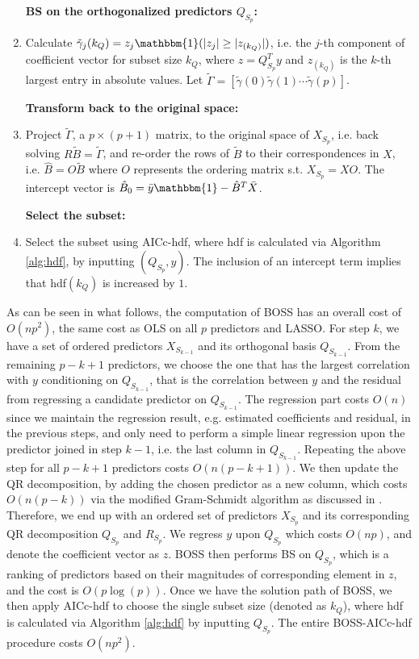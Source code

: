 \begin{algorithm}
\begin{enumerate}[label=\arabic*.]
		\textbf{BS on the orthogonalized predictors $Q_{S_{p}}$:}

		\item Calculate $\tilde{\gamma}_j (k_Q)= z_j \mathbbm{1}(|z_j| \ge |z_{(k_Q)}|)$, i.e. the $j$-th component of coefficient vector for subset size $k_Q$, where $z=Q_{S_p}^T y$ and $z_{(k_Q)}$ is the $k$-th largest entry in absolute values. Let $\tilde{\Gamma} = [\tilde{\gamma} (0) \tilde{\gamma} (1) \cdots \tilde{\gamma} (p)]$.
		
		\textbf{Transform back to the original space:}

		\item Project $\tilde{\Gamma}$, a $p \times (p+1)$ matrix, to the original space of $X_{S_p}$, i.e. back solving $R \tilde{B} = \tilde{\Gamma}$, and re-order the rows of $\tilde{B}$ to their correspondences in $X$, i.e. $\hat{B} = O \tilde{B}$ where $O$ represents the ordering matrix s.t. $X_{S_p}=XO$. The intercept vector is $\hat{B}_0 = \bar{y} \mathbbm{1} - \hat{B}^T \bar{X}$. 

		\textbf{Select the subset:}

		\item Select the subset using AICc-hdf, where hdf is calculated via Algorithm \ref{alg:hdf}, by inputting $(Q_{S_p},y)$. The inclusion of an intercept term implies that hdf$(k_Q)$ is increased by $1$.
	\end{enumerate}
\end{algorithm}


As can be seen in what follows, the computation of BOSS has an overall cost of $O(np^2)$, the same cost as OLS on all $p$ predictors and LASSO. For step $k$, we have a set of ordered predictors $X_{S_{k-1}}$ and its orthogonal basis $Q_{S_{k-1}}$. From the remaining $p-k+1$ predictors, we choose the one that has the largest correlation with $y$ conditioning on $Q_{S_{k-1}}$, that is the correlation between $y$ and the residual from regressing a candidate predictor on $Q_{S_{k-1}}$. The regression part costs $O(n)$ since we maintain the regression result, e.g. estimated coefficients and residual, in the previous steps, and only need to perform a simple linear regression upon the predictor joined in step $k-1$, i.e. the last column in $Q_{S_{k-1}}$. Repeating the above step for all $p-k+1$ predictors costs $O(n(p-k+1))$. We then update the QR decomposition, by adding the chosen predictor as a new column, which costs $O(n(p-k))$ via the modified Gram-Schmidt algorithm as discussed in \citet{hammarling2008updating}. Therefore, we end up with an ordered set of predictors $X_{S_p}$ and its corresponding QR decomposition $Q_{S_p}$ and $R_{S_p}$. We regress $y$ upon $Q_{S_p}$ which costs $O(np)$, and denote the coefficient vector as $z$. BOSS then performs BS on $Q_{S_p}$, which is a ranking of predictors based on their magnitudes of corresponding element in $z$, and the cost is $O(p\log(p))$. Once we have the solution path of BOSS, we then apply AICc-hdf to choose the single subset size (denoted as $k_Q$), where hdf is calculated via Algorithm \ref{alg:hdf} by inputting $Q_{S_p}$. The entire BOSS-AICc-hdf procedure costs $O(np^2)$. 

